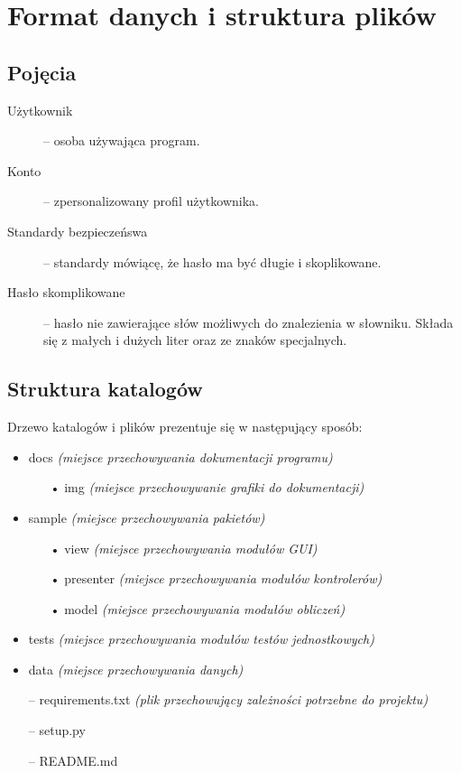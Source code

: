 \documentclass[a4paper]{article}
\begin{document}
\section{Format danych i struktura plików}

\subsection{Pojęcia}
\begin{description}
    \item[Użytkownik]-- osoba używająca program.
    \item[Konto]-- zpersonalizowany profil użytkownika.
    \item[Standardy bezpieczeńswa]-- standardy mówiącę, że hasło ma być długie i skoplikowane.
    \item[Hasło skomplikowane]-- hasło nie zawierające słów możliwych do znalezienia w słowniku. Składa się z małych i dużych liter oraz ze znaków specjalnych.
\end{description}

\subsection{Struktura katalogów}
Drzewo katalogów i plików prezentuje się w następujący sposób:
\begin{itemize}
    \item docs \textit{(miejsce przechowywania dokumentacji programu)}
    \begin{itemize}
        \item[•] img \textit{(miejsce przechowywanie grafiki do dokumentacji)}
    \end{itemize}
    \item sample \textit{(miejsce przechowywania pakietów)}
    \begin{itemize}
        \item[•] view \textit{(miejsce przechowywania modułów GUI)}
        \item[•] presenter \textit{(miejsce przechowywania modułów kontrolerów)}
        \item[•] model \textit{(miejsce przechowywania modułów obliczeń)}
    \end{itemize}
    \item tests \textit{(miejsce przechowywania modułów testów jednostkowych)}
    \item data \textit{(miejsce przechowywania danych)}
    \item[--] requirements.txt \textit{(plik przechowujący zależności potrzebne do projektu)}
    \item[--] setup.py
    \item[--] README.md
\end{itemize}
\end{document}
